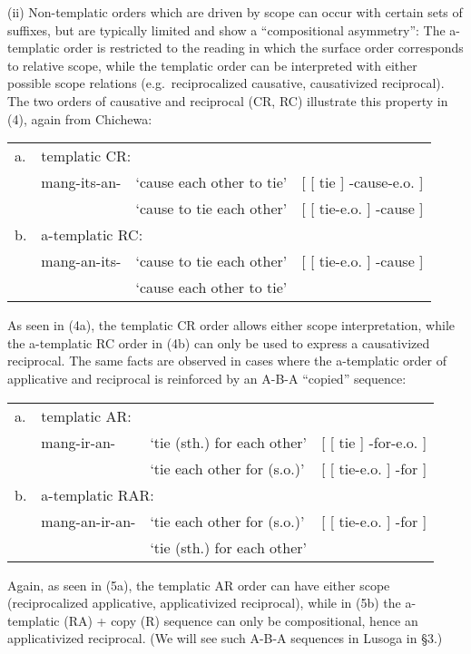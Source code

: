\documentclass[output=paper,
modfonts
]{LSP/langsci}
\begin{document}
(ii) Non-templatic orders which are driven by scope can occur with
certain sets of suffixes, but are typically limited and show a
``compositional asymmetry'': The a-templatic order is restricted to the
reading in which the surface order corresponds to relative scope, while
the templatic order can be interpreted with either possible scope
relations (e.g.\ reciprocalized causative, causativized reciprocal). The
two orders of causative and reciprocal (CR, RC) illustrate this property
in (4), again from Chichewa:

\ea
\begin{tabular}[t]{@{}llll}
	a. & \multicolumn{3}{l}{templatic CR:}\\
	& mang-its-an- & `cause each other to tie' & [ [ tie ] -cause-e.o. ] \\
	& & `cause to tie each other' & [ [ tie-e.o. ] -cause ] \\
	b. & \multicolumn{3}{l}{a-templatic RC:}\\
	& mang-an-its- & `cause to tie each other' & [ [ tie-e.o. ] -cause ] \\
	& & \ljudge{*}`cause each other to tie' & \\
\end{tabular}
\z


\noindent As seen in (4a), the templatic CR order allows either scope
interpretation, while the a-templatic RC order in (4b) can only be used
to express a causativized reciprocal. The same facts are observed in
cases where the a-templatic order of applicative and reciprocal is
reinforced by an A-B-A ``copied'' sequence:

\ea
\begin{tabular}[t]{@{}llll}
	a. & \multicolumn{3}{l}{templatic AR:}\\
	& mang-ir-an- & `tie (sth.) for each other' & [ [ tie ] -for-e.o. ] \\
	& & `tie each other for (s.o.)' & [ [ tie-e.o. ] -for ] \\
	b. & \multicolumn{3}{l}{a-templatic RAR:}\\
	& mang-an-ir-an- & `tie each other for (s.o.)' & [ [ tie-e.o. ] -for ] \\
	& & \ljudge{*}`tie (sth.) for each other' & \\
\end{tabular}
\z

\noindent Again, as seen in (5a), the templatic AR order can have either scope
(reciprocalized applicative, applicativized reciprocal), while in (5b)
the a-templatic (RA) + copy (R) sequence can only be compositional, hence
an applicativized reciprocal. (We will see such A-B-A sequences in
Lusoga in §3.)
\end{document}
